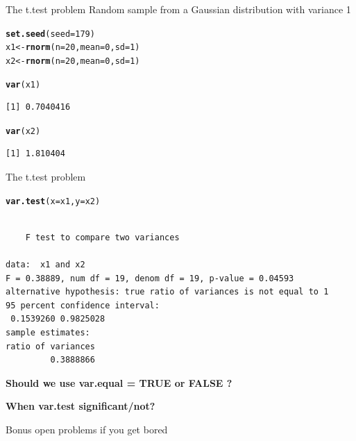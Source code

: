 \documentclass[10pt]{beamer}\usepackage[]{graphicx}\usepackage[]{color}
\makeatletter
\newcommand{\hlnum}[1]{\textcolor[rgb]{0.686,0.059,0.569}{#1}}%
\newcommand{\hlstd}[1]{\textcolor[rgb]{0.345,0.345,0.345}{#1}}%
\newcommand{\hlkwb}[1]{\textcolor[rgb]{0.69,0.353,0.396}{#1}}%
\newcommand{\hlkwc}[1]{\textcolor[rgb]{0.333,0.667,0.333}{#1}}%
\newcommand{\hlkwd}[1]{\textcolor[rgb]{0.737,0.353,0.396}{\textbf{#1}}}%
\newenvironment{kframe}{%
 \def\at@end@of@kframe{}%
 \ifinner\ifhmode%
  \def\at@end@of@kframe{\end{minipage}}%
  \begin{minipage}{\columnwidth}%
 \fi\fi%
 \def\FrameCommand##1{\hskip\@totalleftmargin \hskip-\fboxsep
 \colorbox{shadecolor}{##1}\hskip-\fboxsep
     \hskip-\linewidth \hskip-\@totalleftmargin \hskip\columnwidth}%
 \MakeFramed {\advance\hsize-\width
   \@totalleftmargin\z@ \linewidth\hsize
   \@setminipage}}%
 {\par\unskip\endMakeFramed%
 \at@end@of@kframe}
\newenvironment{knitrout}{}{} %
\makeatother
\begin{document}
\begin{frame}[fragile]{The t.test problem}
  Random sample from a Gaussian distribution with variance 1
\begin{knitrout}
\color{fgcolor}\begin{kframe}
\begin{alltt}
  \hlkwd{set.seed}\hlstd{(}\hlkwc{seed} \hlstd{=} \hlnum{179}\hlstd{)}
  \hlstd{x1} \hlkwb{<-} \hlkwd{rnorm}\hlstd{(}\hlkwc{n} \hlstd{=} \hlnum{20}\hlstd{,} \hlkwc{mean} \hlstd{=} \hlnum{0}\hlstd{,} \hlkwc{sd} \hlstd{=} \hlnum{1}\hlstd{)}
  \hlstd{x2} \hlkwb{<-} \hlkwd{rnorm}\hlstd{(}\hlkwc{n} \hlstd{=} \hlnum{20}\hlstd{,} \hlkwc{mean} \hlstd{=} \hlnum{0}\hlstd{,} \hlkwc{sd} \hlstd{=} \hlnum{1}\hlstd{)}


  \hlkwd{var}\hlstd{(x1)}
\end{alltt}
\begin{verbatim}
[1] 0.7040416
\end{verbatim}
\begin{alltt}
  \hlkwd{var}\hlstd{(x2)}
\end{alltt}
\begin{verbatim}
[1] 1.810404
\end{verbatim}
\end{kframe}
\end{knitrout}
\end{frame}

\begin{frame}[fragile]{The t.test problem}
\begin{knitrout}
\color{fgcolor}\begin{kframe}
\begin{alltt}
  \hlkwd{var.test}\hlstd{(}\hlkwc{x} \hlstd{= x1,} \hlkwc{y} \hlstd{= x2)}
\end{alltt}
\begin{verbatim}

	F test to compare two variances

data:  x1 and x2
F = 0.38889, num df = 19, denom df = 19, p-value = 0.04593
alternative hypothesis: true ratio of variances is not equal to 1
95 percent confidence interval:
 0.1539260 0.9825028
sample estimates:
ratio of variances 
         0.3888866 
\end{verbatim}
\end{kframe}
\end{knitrout}
  \textbf{Should we use var.equal = TRUE or FALSE ?\\}
  
  \textbf{When var.test significant/not?}
\end{frame}

\begin{frame}{}

\end{frame}
\begin{frame}{Bonus open problems if you get bored}

  
\end{frame}
  
\end{document}
